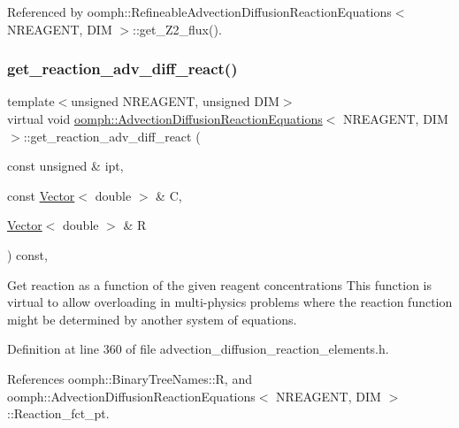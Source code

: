 Referenced by oomph\+::\+Refineable\+Advection\+Diffusion\+Reaction\+Equations$<$ N\+R\+E\+A\+G\+E\+N\+T, D\+I\+M $>$\+::get\+\_\+\+Z2\+\_\+flux().

\mbox{\label{classoomph_1_1AdvectionDiffusionReactionEquations_afcd57b515d90c0a55406d11ec6316856}} 
\subsubsection{\texorpdfstring{get\+\_\+reaction\+\_\+adv\+\_\+diff\+\_\+react()}{get\_reaction\_adv\_diff\_react()}}
{\footnotesize\ttfamily template$<$unsigned N\+R\+E\+A\+G\+E\+NT, unsigned D\+IM$>$ \\
virtual void \hyperlink{classoomph_1_1AdvectionDiffusionReactionEquations}{oomph\+::\+Advection\+Diffusion\+Reaction\+Equations}$<$ N\+R\+E\+A\+G\+E\+NT, D\+IM $>$\+::get\+\_\+reaction\+\_\+adv\+\_\+diff\+\_\+react (\begin{DoxyParamCaption}\item[{const unsigned \&}]{ipt,  }\item[{const \hyperlink{classoomph_1_1Vector}{Vector}$<$ double $>$ \&}]{C,  }\item[{\hyperlink{classoomph_1_1Vector}{Vector}$<$ double $>$ \&}]{R }\end{DoxyParamCaption}) const\hspace{0.3cm}{\ttfamily [inline]}, {\ttfamily [virtual]}}



Get reaction as a function of the given reagent concentrations This function is virtual to allow overloading in multi-\/physics problems where the reaction function might be determined by another system of equations. 



Definition at line 360 of file advection\+\_\+diffusion\+\_\+reaction\+\_\+elements.\+h.



References oomph\+::\+Binary\+Tree\+Names\+::R, and oomph\+::\+Advection\+Diffusion\+Reaction\+Equations$<$ N\+R\+E\+A\+G\+E\+N\+T, D\+I\+M $>$\+::\+Reaction\+\_\+fct\+\_\+pt.

